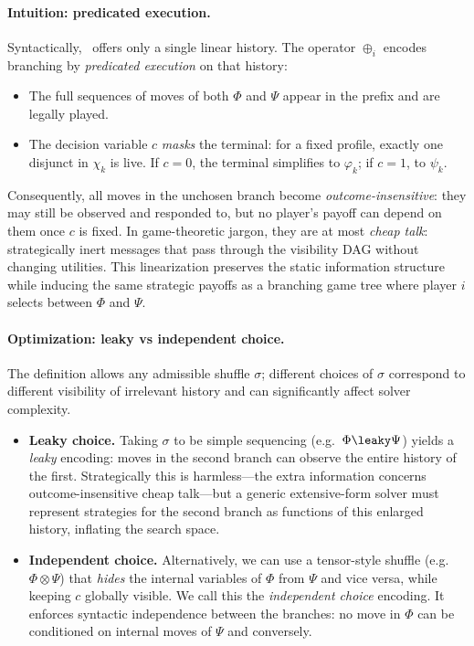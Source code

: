 \paragraph{Intuition: predicated execution.}
Syntactically, \KFOL\ offers only a single linear history.
The operator $\oplus_i$ encodes branching by \emph{predicated execution} on that history:
\begin{itemize}
  \item The full sequences of moves of both $\Phi$ and $\Psi$ appear in the prefix and are legally played.
  \item The decision variable $c$ \emph{masks} the terminal: for a fixed profile, exactly one disjunct in $\chi_k$ is live.
        If $c = 0$, the terminal simplifies to $\varphi_k$; if $c = 1$, to $\psi_k$.
\end{itemize}
Consequently, all moves in the unchosen branch become \emph{outcome-insensitive}: they may still be observed and responded to, but no player’s payoff can depend on them once $c$ is fixed.
In game-theoretic jargon, they are at most \emph{cheap talk}: strategically inert messages that pass through the visibility DAG without changing utilities.
This linearization preserves the static information structure while inducing the same strategic payoffs as a branching game tree where player $i$ selects between $\Phi$ and $\Psi$.

\paragraph{Optimization: leaky vs independent choice.}
The definition allows any admissible shuffle $\sigma$; different choices of $\sigma$ correspond to different visibility of irrelevant history and can significantly affect solver complexity.

\begin{itemize}
  \item \textbf{Leaky choice.}
        Taking $\sigma$ to be simple sequencing (e.g.\ $\Phi \leaky \Psi$) yields a \emph{leaky} encoding:
        moves in the second branch can observe the entire history of the first.
        Strategically this is harmless---the extra information concerns outcome-insensitive cheap talk---but a generic extensive-form solver must represent strategies for the second branch as functions of this enlarged history, inflating the search space.

  \item \textbf{Independent choice.}
        Alternatively, we can use a tensor-style shuffle (e.g.\ $\Phi \otimes \Psi$) that \emph{hides} the internal variables of $\Phi$ from $\Psi$ and vice versa, while keeping $c$ globally visible.
        We call this the \emph{independent choice} encoding.
        It enforces syntactic independence between the branches: no move in $\Phi$ can be conditioned on internal moves of $\Psi$ and conversely.
\end{itemize}


